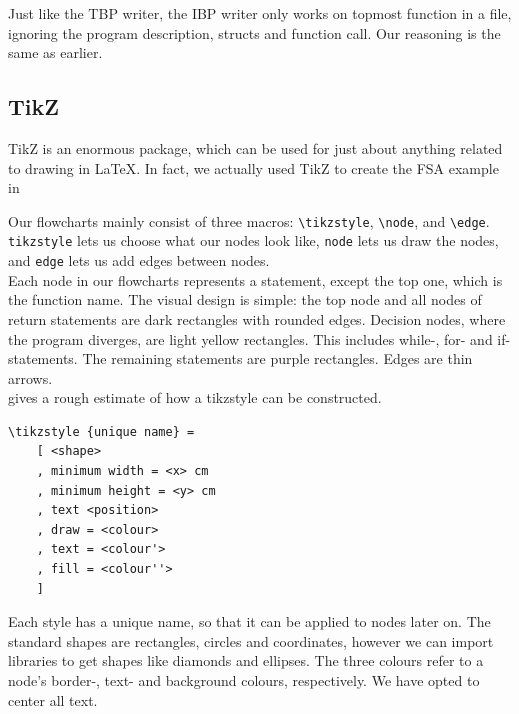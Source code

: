 Just like the TBP writer, the IBP writer only works on topmost function in a file, ignoring the program description, structs and function call. Our reasoning is the same as earlier. \\

\subsection{TikZ}

TikZ is an enormous package, which can be used for just about anything related to drawing in LaTeX. In fact, we actually used TikZ to create the FSA example in  \\


Our flowcharts mainly consist of three macros: \texttt{\textbackslash tikzstyle}, \texttt{\textbackslash node}, and \texttt{\textbackslash edge}. \texttt{tikzstyle} lets us choose what our nodes look like, \texttt{node} lets us draw the nodes, and \texttt{edge} lets us add edges between nodes. \\

Each node in our flowcharts represents a statement, except the top one, which is the function name. The visual design is simple: the top node and all nodes of return statements are dark rectangles with rounded edges. Decision nodes, where the program diverges, are light yellow rectangles. This includes while-, for- and if-statements. The remaining statements are purple rectangles. Edges are thin arrows. \\

 gives a rough estimate of how a tikzstyle can be constructed. \\

\begin{lstlisting}[caption={Rough description of tikzstyle attributes.}, captionpos=b, label={Rough description of tikzstyle attributes.}]
\tikzstyle {unique name} =
    [ <shape>
    , minimum width = <x> cm
    , minimum height = <y> cm
    , text <position>
    , draw = <colour>
    , text = <colour'>
    , fill = <colour''>
    ]
\end{lstlisting}

Each style has a unique name, so that it can be applied to nodes later on.  The standard shapes are rectangles, circles and coordinates, however we can import libraries to get shapes like diamonds and ellipses. The three colours refer to a node's border-, text- and background colours, respectively. We have opted to center all text. \\

